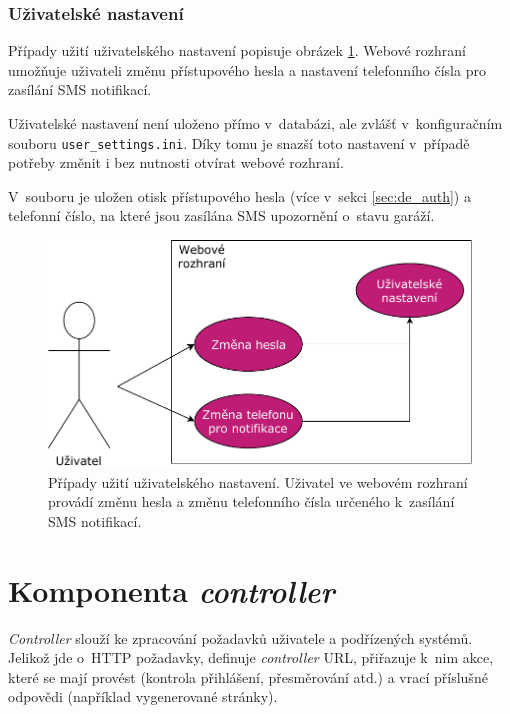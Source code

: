\subsubsection{Uživatelské nastavení}
\label{sec:de_user_settings}

Případy užití uživatelského nastavení popisuje obrázek \ref{fig:use_case_user}. Webové rozhraní umožňuje uživateli změnu přístupového hesla a nastavení telefonního čísla pro zasílání SMS notifikací.

Uživatelské nastavení není uloženo přímo v~databázi, ale zvlášť v~konfiguračním souboru \texttt{user\_settings.ini}. Díky tomu je snazší toto nastavení v~případě potřeby změnit i bez nutnosti otvírat webové rozhraní.

V~souboru je uložen otisk přístupového hesla (více v~sekci \ref{sec:de_auth}) a telefonní číslo, na které jsou zasílána SMS upozornění o~stavu garáží.

\begin{figure}[h!]
    \centering
    \includegraphics[width=\textwidth]{images/use_case_user.pdf}
    \caption[Případy užití uživatelského nastavení]{Případy užití uživatelského nastavení. Uživatel ve webovém rozhraní provádí změnu hesla a změnu telefonního čísla určeného k~zasílání SMS notifikací.}
    \label{fig:use_case_user}
\end{figure}


\section{Komponenta \textit{controller}}
\label{sec:de_controller}

\textit{Controller} slouží ke zpracování požadavků uživatele a podřízených systémů. Jelikož jde o~HTTP požadavky, definuje \textit{controller} URL, přiřazuje k~nim akce, které se mají provést (kontrola přihlášení, přesměrování atd.) a vrací příslušné odpovědi (například vygenerované stránky).

